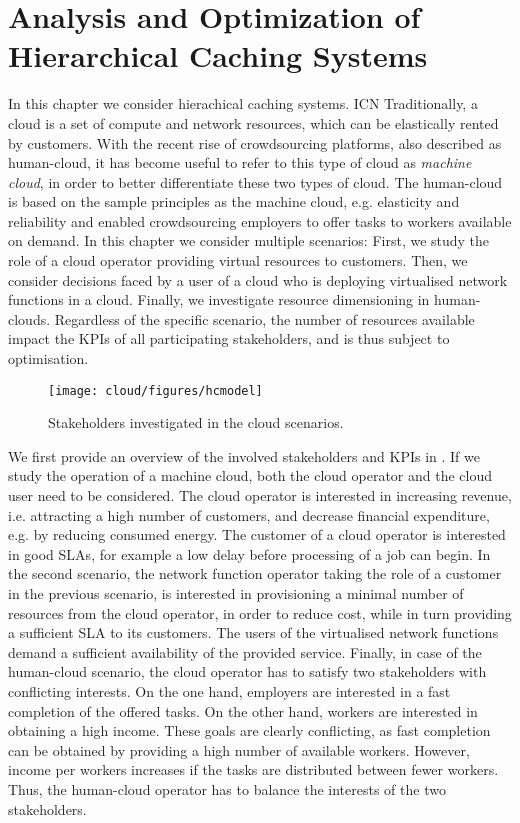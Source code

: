 \chapter{Analysis and Optimization of Hierarchical Caching Systems}\label{chap:hierarchical}

In this chapter we consider hierachical caching systems. \cite{krishnappa2011feasibility}
ICN
Traditionally, a cloud is a set of compute and network resources, which can be elastically rented by customers.
With the recent rise of crowdsourcing platforms, also described as human-cloud, it has become useful to refer to this type of cloud as \emph{machine cloud}, in order to better differentiate these two types of cloud.
The human-cloud is based on the sample principles as the machine cloud, e.g. elasticity and reliability and enabled crowdsourcing employers to offer tasks to workers available on demand.
In this chapter we consider multiple scenarios:
First, we study the role of a cloud operator providing virtual resources to customers.
Then, we consider decisions faced by a user of a cloud who is deploying virtualised network functions in a cloud.
Finally, we investigate resource dimensioning in human-clouds.
Regardless of the specific scenario, the number of resources available impact the \glspl{KPI} of all participating stakeholders, and is thus subject to optimisation.

\begin{figure}
  \centering
  \texttt{[image: cloud/figures/hcmodel]}
  \caption{Stakeholders investigated in the cloud scenarios.}
  \label{fig:hcmodel}
\end{figure}

We first provide an overview of the involved stakeholders and \glspl{KPI} in .
If we study the operation of a machine cloud, both the cloud operator and the cloud user need to be considered.
The cloud operator is interested in increasing revenue, i.e. attracting a high number of customers, and decrease financial expenditure, e.g. by reducing consumed energy.
The customer of a cloud operator is interested in good \glspl{SLA}, for example a low delay before processing of a job can begin.
In the second scenario, the network function operator taking the role of a customer in the previous scenario, is interested in provisioning a minimal number of resources from the cloud operator, in order to reduce cost, while in turn providing a sufficient \gls{SLA} to its customers.
The users of the virtualised network functions demand a sufficient availability of the provided service.
Finally, in case of the human-cloud scenario, the cloud operator has to satisfy two stakeholders with conflicting interests.
On the one hand, employers are interested in a fast completion of the offered tasks.
On the other hand, workers are interested in obtaining a high income.
These goals are clearly conflicting, as fast completion can be obtained by providing a high number of available workers.
However, income per workers increases if the tasks are distributed between fewer workers.
Thus, the human-cloud operator has to balance the interests of the two stakeholders.

